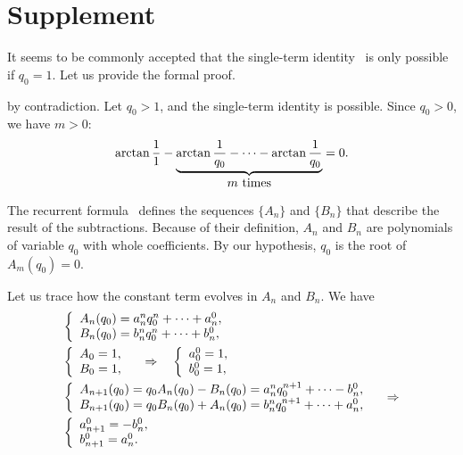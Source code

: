 \documentclass[draft, 11pt]{article} %
\def\fact#1{Fact~\ref{#1}}
\begin{document}
\section{Supplement}

\noindent{\bf \fact{nosingle}.\/} It seems to be commonly accepted that
the single-term identity~ is only possible if $q_0=1$.
Let us provide the formal proof.

 by contradiction. Let $q_0>1$, and the single-term identity is possible.
Since $q_0>0$, we have $m>0$:
$$
\arctan \dfrac{1}{1} - \underbrace{\arctan \dfrac{1}{q_0} - \dots - \arctan \dfrac{1}{q_0}}_{\hbox{$m$ times}} = 0.
$$

The recurrent formula~ defines the sequences $\{ A_n \}$ and $\{ B_n \}$ that
describe the result of the subtractions.
Because of their definition, $A_n$ and $B_n$ are polynomials of variable $q_0$
with whole coefficients. By our hypothesis, $q_0$ is the root of $A_m(q_0)=0$.

Let us trace how the constant term evolves in $A_n$ and $B_n$.
We have
$$
\begin{array}{l}
%
\left\{\begin{array}{l}
A_n(q_0) = a_n^n q_0^n + \dots + a_n^0, \\
B_n(q_0) = b_n^n q_0^n + \dots + b_n^0,
\end{array}\right. \\[1em]
%
\left\{\begin{array}{l}
A_0=1, \\
B_0=1,
\end{array}\right.
\quad\ergo\quad
\left\{\begin{array}{l}
a_0^0 = 1, \\
b_0^0 = 1,
\end{array}\right. \\[1em]
%
\left\{\begin{array}{l}
A_{n+1}(q_0) = q_0 A_n(q_0) - B_n(q_0) = a_n^n q_0^{n+1} + \dots - b_n^0, \\
B_{n+1}(q_0) = q_0 B_n(q_0) + A_n(q_0) = b_n^n q_0^{n+1} + \dots + a_n^0,
\end{array}\right.  \quad\ergo \\[1em]
%
\left\{\begin{array}{l}
a_{n+1}^0 = - b_n^0, \\
b_{n+1}^0 = a_n^0.
\end{array}\right.
%
\end{array}
$$
\end{document}

